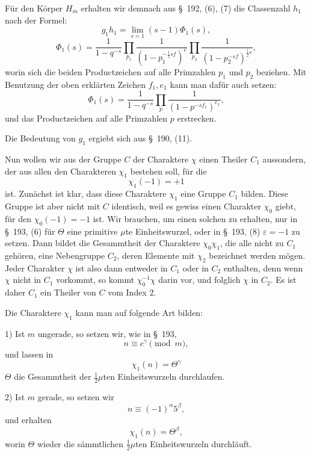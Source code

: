 \documentclass[11pt]{article}
\providecommand{\eps}{\varepsilon}
\providecommand{\eps}{\varepsilon}
\begin{document}
Für den Körper $H_m$ erhalten wir demnach aus \S~192, (6), (7) die Classenzahl $h_1$ nach der Formel:
\begin{equation}
g_1h_1=\lim_{s=1}(s-1)\Phi_1(s),
\tag{2}
\end{equation}
\begin{equation}
\Phi_1(s)=\frac1{1-q^{-s}}\prod_{p_1}\frac1{(1-p_1^{-\frac12sf})^e}\prod_{p_2}\frac1{(1-p_2^{-sf})^{\frac12e}},
\tag{3}
\end{equation}
worin sich die beiden Productzeichen auf alle Primzahlen $p_1$ und $p_2$ beziehen. Mit Benutzung der oben erklärten Zeichen $f_1,e_1$ kann man dafür auch setzen:
\begin{equation}
\Phi_1(s)=\frac1{1-q^{-s}}\prod_p\frac1{(1-p^{-sf_1})^{e_1}},
\tag{4}
\end{equation}
und das Productzeichen auf alle Primzahlen $p$ erstrecken.

Die Bedeutung von $g_1$ ergiebt sich aus \S~190, (11).

Nun wollen wir aus der Gruppe $C$ der Charaktere $\chi$ einen Theiler $C_1$ aussondern, der aus allen den Charakteren $\chi_1$ bestehen soll, für die
\begin{equation}
\chi_1(-1)=+1
\tag{5}
\end{equation}
ist. Zunächst ist klar, dass diese Charaktere $\chi_1$ eine Gruppe $C_1$ bilden. Diese Gruppe ist aber nicht mit $C$ identisch, weil es gewiss einen Charakter $\chi_0$ giebt, für den $\chi_0(-1)=-1$ ist. Wir brauchen, um einen solchen zu erhalten, nur in \S~193, (6) für $\Theta$ eine primitive $\mu$te Einheitswurzel, oder in \S~193, (8) $\eps=-1$ zu setzen. Dann bildet die Gesammtheit der Charaktere $\chi_0\chi_1$, die alle nicht zu $C_1$ gehören, eine Nebengruppe $C_2$, deren Elemente mit $\chi_2$ bezeichnet werden mögen. Jeder Charakter $\chi$ ist also dann entweder in $C_1$ oder in $C_2$ enthalten, denn wenn $\chi$ nicht in $C_1$ vorkommt, so kommt $\chi_0^{-1}\chi$ darin vor, und folglich $\chi$ in $C_2$. Es ist daher $C_1$ ein Theiler von $C$ vom Index 2.

Die Charaktere $\chi_1$ kann man auf folgende Art bilden:

1) Ist $m$ ungerade, so setzen wir, wie in \S~193,
\[
n\equiv c^\gamma\pmod m,
\]
und lassen in
\begin{equation}
\chi_1(n)=\Theta^\gamma
\tag{6}
\end{equation}
$\Theta$ die Gesammtheit der $\frac12\mu$ten Einheitswurzeln durchlaufen.

2) Ist $m$ gerade, so setzen wir
\[
n\equiv(-1)^\alpha5^\beta,
\]
und erhalten
\begin{equation}
\chi_1(n)=\Theta^\beta,
\tag{7}
\end{equation}
worin $\Theta$ wieder die sämmtlichen $\frac12\mu$ten Einheitswurzeln durchläuft.
\end{document}
